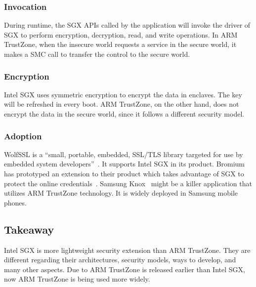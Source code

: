 \subsubsection{Invocation}
During runtime, the SGX APIs called by the application will invoke
the driver of SGX to perform encryption, decryption, read, and write
operations. In ARM TrustZone, when the insecure world requests a service
in the secure world, it makes a SMC call to transfer the control to
the secure world.    



\subsubsection{Encryption}
Intel SGX uses symmetric encryption to encrypt the data in 
enclaves. The key will be refreshed in every boot. ARM TrustZone,
on the other hand, does not encrypt the data in the secure world,
since it follows a different security model.      



\subsubsection{Adoption}
WolfSSL is a ``small, portable, embedded, SSL/TLS library targeted
for use by embedded system developers''~\cite{wolfssl}. It supports Intel SGX in
its product. Bromium has prototyped an extension to their product 
which takes advantage of SGX to protect the online credentials~\cite{bromium}.
Samsung Knox~\cite{knox} might be a killer application that utilizes ARM TrustZone
technology. It is widely deployed in Samsung mobile phones. 


\subsection{Takeaway}
Intel SGX is more lightweight security extension than ARM TrustZone.
They are different regarding their architectures, security models,
ways to develop, and many other aspects. Due to ARM TrustZone is released
earlier than Intel SGX, now ARM TrustZone is being used more widely.   




